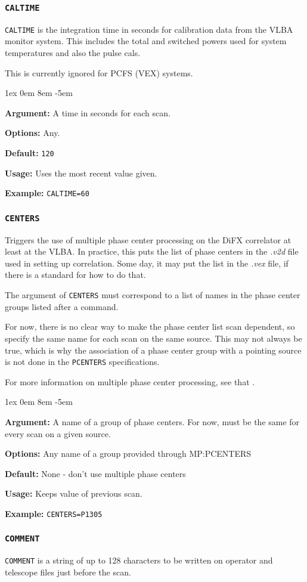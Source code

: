 \documentclass{report}
\newcommand{\rcwbox}[5]{
  \begin{list}{}{\parsep 1ex  \itemsep 0em
                 \leftmargin 8em  \itemindent -5em }
    \item {\bf Argument:} #1
    \item {\bf Options:}  #2
    \item {\bf Default:}  #3
    \item {\bf Usage:}    #4
    \item {\bf Example:}  #5
  \end{list}
}
\begin{document}
\subsubsection{\label{MP:CALTIME}{\tt CALTIME}}

{\tt CALTIME} is the integration time in seconds for calibration
data from the VLBA monitor system. This includes the total and
switched powers used for system temperatures and also the pulse
cals.

This is currently ignored for PCFS (VEX) systems.

\rcwbox
{A time in seconds for each scan.}
{Any.}
{{\tt 120}}
{Uses the most recent value given.}
{{\tt CALTIME=60}}


\subsubsection{\label{MP:CENTERS}{\tt CENTERS}}

Triggers the use of multiple phase center processing on the
DiFX correlator at least at the VLBA.  In practice, this puts
the list of phase centers in the {\sl .v2d} file used in
setting up correlation.  Some day, it may put the list in
the {\sl .vex} file, if there is a standard for how to do that.

The argument of {\tt CENTERS} must correspond to a list of
names in the phase center groups listed after a
 command.

For now, there is no clear way to make the phase center list
scan dependent, so specify the same name for each scan on the
same source.  This may not always be true, which is why the
association of a phase center group with a pointing
source is not done in the {\tt PCENTERS} specifications.

For more information on multiple phase center processing, see
that .

\rcwbox
{A name of a group of phase centers.  For now, must be the
same for every scan on a given source.}
{Any name of a group provided through \htmlref{{\tt PCENTERS}}
{MP:PCENTERS}}
{None - don't use multiple phase centers}
{Keeps value of previous scan.}
{\tt CENTERS=P1305}

\subsubsection{\label{MP:COMMENT}{\tt COMMENT}}

{\tt COMMENT} is a string of up to 128 characters to be written on
operator and telescope files just before the scan.
\end{document}
